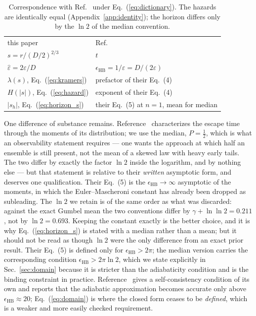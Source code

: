 \documentclass[%
 twocolumn,
 superscriptaddress,
 amsmath,amssymb,
 aps,
 pre,
 floatfix,
]{revtex4-2}
\newcommand{\Sig}{\hat\varepsilon}
\begin{document}
\begin{table}[b]
\caption{\label{tab:dictionary}%
Correspondence with Ref.~\cite{HerbertBouchet2017} under Eq.~(\ref{eq:dictionary}).  The hazards are identically equal (Appendix~\ref{app:identity}); the horizon differs only by the $\ln2$ of the median convention.}
\begin{ruledtabular}
\begin{tabular}{ll}
this paper & Ref.~\cite{HerbertBouchet2017} \\
\colrule
$s=r/(D/2)^{2/3}$ & $t$ \\
$\Sig=2\varepsilon/D$ & $\epsilon_{\mathrm{HB}}=1/\Sig=D/(2\varepsilon)$ \\
$\lambda(s)$, Eq.~(\ref{eq:kramers}) & prefactor of their Eq.~(4) \\
$H(|s|)$, Eq.~(\ref{eq:hazard}) & exponent of their Eq.~(4) \\
$|s_h|$, Eq.~(\ref{eq:horizon_s}) & their Eq.~(5) at $n=1$, mean for median \\
\end{tabular}
\end{ruledtabular}
\end{table}

One difference of substance remains.  Reference~\cite{HerbertBouchet2017} characterizes the escape time through the moments of its distribution; we use the median, $P=\tfrac12$, which is what an observability statement requires --- one wants the approach at which half an ensemble is still present, not the mean of a skewed law with heavy early tails.  The two differ by exactly the factor $\ln2$ inside the logarithm, and by nothing else --- but that statement is relative to their \emph{written} asymptotic form, and deserves one qualification.  Their Eq.~(5) is the $\epsilon_{\mathrm{HB}}\to\infty$ asymptotic of the moments, in which the Euler--Mascheroni constant has already been dropped as subleading.  The $\ln2$ we retain is of the same order as what was discarded: against the exact Gumbel mean the two conventions differ by $\gamma+\ln\ln2=0.211$, not by $\ln2=0.693$.  Keeping the constant exactly is the better choice, and it is why Eq.~(\ref{eq:horizon_s}) is stated with a median rather than a mean; but it should not be read as though $\ln2$ were the only difference from an exact prior result.  Their Eq.~(5) is defined only for $\epsilon_{\mathrm{HB}}>2\pi$; the median version carries the corresponding condition $\epsilon_{\mathrm{HB}}>2\pi\ln2$, which we state explicitly in Sec.~\ref{sec:domain} because it is stricter than the adiabaticity condition and is the binding constraint in practice.  Reference~\cite{HerbertBouchet2017} gives a self-consistency condition of its own and reports that the adiabatic approximation becomes accurate only above $\epsilon_{\mathrm{HB}}\approx20$; Eq.~(\ref{eq:domain}) is where the closed form ceases to be \emph{defined}, which is a weaker and more easily checked requirement.
\end{document}
